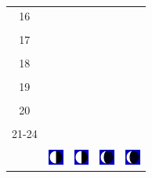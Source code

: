 \documentclass[a4paper,12pt, tikz]{scrartcl}
\begin{document}
\begin{tabularx}{\linewidth}{|c|X|X|p{2cm}|p{2cm}|}
            &   &       &    &   \\
          \hline
          16&   &                 &    &   \\
            &   &       &    &   \\
          \hline
          17&   &                 &    &   \\
            &   &       &    &   \\
          \hline
          18&   &                 &    &   \\
            &   &       &    &   \\
          \hline
          19&   &                 &     &   \\
            &   &       &    &   \\
          \hline
          20&   &              &    &   \\
            &   &       &    &   \\
          \hline 
          21-24&   &              &    &   \\
            &   &       &    &   \\
          \hline
                      & \vspace{0.01cm} \centerline{\includegraphics[width=0.5cm]{moon_phases/Moon_phase_6.svg.png}} \vspace{0.1cm} & \vspace{0.01cm} \centerline{\includegraphics[width=0.5cm]{moon_phases/Moon_phase_6.svg.png}} \vspace{0.1cm} & \vspace{0.01cm} \centerline{\includegraphics[width=0.5cm]{moon_phases/Moon_phase_7.svg.png}} \vspace{0.1cm} & \vspace{0.01cm} \centerline{\includegraphics[width=0.5cm]{moon_phases/Moon_phase_7.svg.png}} \vspace{0.1cm}\\
          \hline    
        \end{tabularx}
\end{document}
